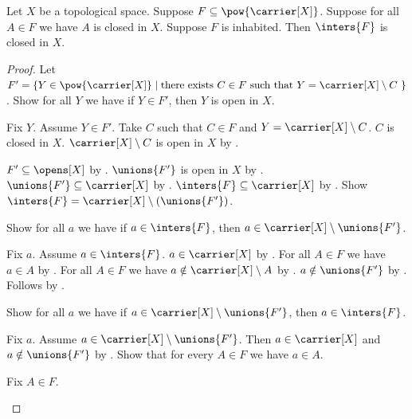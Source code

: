 \begin{proposition}\label{intersection_of_closed_is_closed_infinite}
    Let $X$ be a topological space.
    Suppose $F \subseteq \pow{\carrier[X]}$.
    Suppose for all $A \in F$ we have $A$ is closed in $X$.
    Suppose $F$ is inhabited.
    Then $\inters{F}$ is closed in $X$.
\end{proposition}
\begin{proof}
    Let $F' = \{Y \in \pow{\carrier[X]} \mid \text{there exists $C \in F$ such that $Y = \carrier[X] \setminus C$ }\} $.
    Show for all $Y$ we have if $Y\in F'$, then $Y$ is open in $X$.
    \begin{subproof}
        Fix $Y$.
        Assume $Y\in F'$.
        Take $C$ such that $C\in F$ and
            $Y=\carrier[X]\setminus C$.
        $C$ is closed in $X$.
        $\carrier[X]\setminus C$ is open in $X$
            by .
    \end{subproof}
    $F'\subseteq\opens[X]$ by .
    $\unions{F'}$ is open in $X$ by .
    $\unions{F'}\subseteq\carrier[X]$
        by .
    $\inters{F}\subseteq\carrier[X]$
        by .
    Show $\inters{F} = \carrier[X] \setminus (\unions{F'})$.
    \begin{subproof}
        Show for all $a$ we have if $a\in\inters{F}$, then
            $a\in\carrier[X]\setminus\unions{F'}$.
        \begin{subproof}
            Fix $a$.
            Assume $a\in\inters{F}$.
            $a\in\carrier[X]$
                by .
            For all $A\in F$ we have $a\in A$
                by .
            For all $A\in F$ we have
                $a\notin\carrier[X]\setminus A$ by .
            $a\notin\unions{F'}$ by .
            Follows by .
        \end{subproof}
        Show for all $a$ we have if
            $a\in\carrier[X]\setminus\unions{F'}$, then $a\in\inters{F}$.
        \begin{subproof}
            Fix $a$.
            Assume $a\in\carrier[X]\setminus\unions{F'}$.
            Then $a\in\carrier[X]$ and $a\notin\unions{F'}$
                by .
            Show that for every $A\in F$ we have $a\in A$.
            \begin{subproof}
                Fix $A\in F$.

\end{subproof}
\end{subproof}
\end{subproof}
\end{proof}
